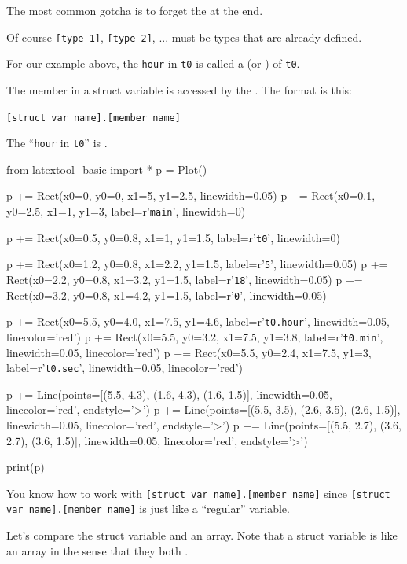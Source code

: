 The most common gotcha is to forget the  at the end.

Of course \texttt{[type 1]}, \texttt{[type 2]}, ... must be types
that are already defined.

For our example above, the \texttt{hour} in \texttt{t0} is called a
 (or ) of \texttt{t0}.

The member in a struct variable is accessed by the . The format is this:

\verb![struct var name].[member name]!

The ``\texttt{hour} in \texttt{t0}'' is .

\begin{python}
from latextool_basic import *
p = Plot()

p += Rect(x0=0, y0=0, x1=5, y1=2.5, linewidth=0.05)
p += Rect(x0=0.1, y0=2.5, x1=1, y1=3, label=r'{\tt main}', linewidth=0)

p += Rect(x0=0.5, y0=0.8, x1=1, y1=1.5, label=r'{\tt t0}', linewidth=0)

p += Rect(x0=1.2, y0=0.8, x1=2.2, y1=1.5, label=r'{\tt 5}', linewidth=0.05)
p += Rect(x0=2.2, y0=0.8, x1=3.2, y1=1.5, label=r'{\tt 18}', linewidth=0.05)
p += Rect(x0=3.2, y0=0.8, x1=4.2, y1=1.5, label=r'{\tt 0}', linewidth=0.05)

p += Rect(x0=5.5, y0=4.0, x1=7.5, y1=4.6, label=r'{\tt t0.hour}', linewidth=0.05, linecolor='red')
p += Rect(x0=5.5, y0=3.2, x1=7.5, y1=3.8, label=r'{\tt t0.min}', linewidth=0.05, linecolor='red')
p += Rect(x0=5.5, y0=2.4, x1=7.5, y1=3, label=r'{\tt t0.sec}', linewidth=0.05, linecolor='red')

p += Line(points=[(5.5, 4.3), (1.6, 4.3), (1.6, 1.5)], linewidth=0.05, linecolor='red', endstyle='>')
p += Line(points=[(5.5, 3.5), (2.6, 3.5), (2.6, 1.5)], linewidth=0.05, linecolor='red', endstyle='>')
p += Line(points=[(5.5, 2.7), (3.6, 2.7), (3.6, 1.5)], linewidth=0.05, linecolor='red', endstyle='>')

print(p)
\end{python}

You  know how to work with \texttt{[struct var name].[member name]} since \texttt{[struct var name].[member name]} is just like a ``regular'' variable.


Let's compare the struct variable and an array. Note that a struct variable is like an array in the sense that they both .

